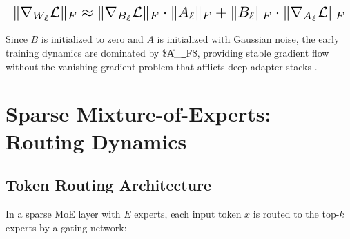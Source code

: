 \documentclass[10pt,journal,compsoc,twocolumn]{IEEEtran}
\begin{document}
\begin{equation}
\resizebox{\columnwidth}{!}{$\displaystyle
\begin{aligned}
\|\nabla_{W_\ell}\mathcal{L}\|_F \approx \|\nabla_{B_\ell}\mathcal{L}\|_F \cdot \|A_\ell\|_F + \|B_\ell\|_F \cdot \|\nabla_{A_\ell}\mathcal{L}\|_F
\end{aligned}
$}
\end{equation}



























Since $B$ is initialized to zero and $A$ is initialized with Gaussian noise, the early training dynamics are dominated by \$\|A\_\ell\|\_F\$, providing stable gradient flow without the vanishing-gradient problem that afflicts deep adapter stacks \cite{arxiv_2305_18290}.




\section{Sparse Mixture-of-Experts: Routing Dynamics}



\subsection{Token Routing Architecture}


In a sparse MoE layer with $E$ experts, each input token $x$ is routed to the top-$k$ experts by a gating network:
\end{document}

